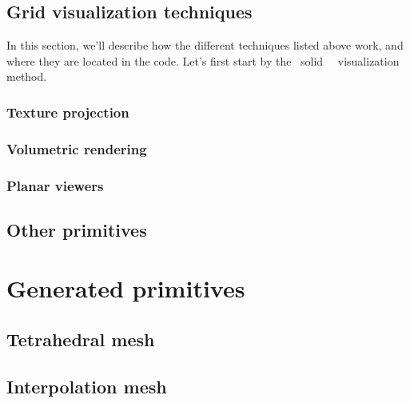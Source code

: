 {	\subsection{Grid visualization techniques}\label{text:03_software_components:02_visualization:01_grids}
	{
		In this section, we'll describe how the different techniques listed above work, and where they are located in the code. Let's first start by the \guillemotleft{}~solid~\guillemotright{}~ visualization method.
		\subsubsection{Texture projection}\label{text:03_software_components:02_visualization:01_grids:01_solid}
		{
		}
		\subsubsection{Volumetric rendering}\label{text:03_software_components:02_visualization:01_grids:01_volumetric}
		{
		}
		\subsubsection{Planar viewers}\label{text:03_software_components:02_visualization:01_grids:01_planar}
		{
		}
	}

	\subsection{Other primitives}\label{text:03_software_components:02_visualization:02_other}
	{

	}
}

\section{Generated primitives}\label{text:03_software_components:03_generated_primitives}
{

	\subsection{Tetrahedral mesh}
	{
	}

	\subsection{Interpolation mesh}
	{
	}
}

